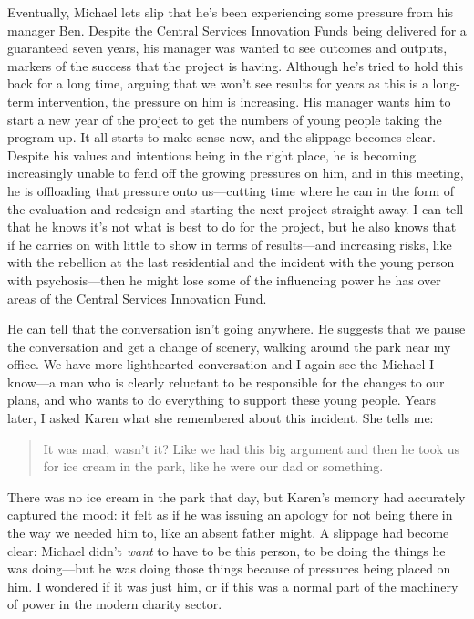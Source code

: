 Eventually, Michael lets slip that he's been experiencing some pressure from his manager Ben. Despite the Central Services Innovation Funds being delivered for a guaranteed seven years, his manager was wanted to see outcomes and outputs, markers of the success that the project is having. Although he's tried to hold this back for a long time, arguing that we won't see results for years as this is a long-term intervention, the pressure on him is increasing. His manager wants him to start a new year of the project to get the numbers of young people taking the program up. It all starts to make sense now, and the slippage becomes clear. Despite his values and intentions being in the right place, he is becoming increasingly unable to fend off the growing pressures on him, and in this meeting, he is offloading that pressure onto us—cutting time where he can in the form of the evaluation and redesign and starting the next project straight away. I can tell that he knows it's not what is best to do for the project, but he also knows that if he carries on  with little to show in terms of results—and increasing risks, like with the rebellion at the last residential and the incident with the young person with psychosis—then he might lose some of the influencing power he has over areas of the Central Services Innovation Fund.

He can tell that the conversation isn't going anywhere. He suggests that we pause the conversation and get a change of scenery, walking around the park near my office. We have more lighthearted conversation and I again see the Michael I know—a man who is clearly reluctant to be responsible for the changes to our plans, and who wants to do everything to support these young people. Years later, I asked Karen what she remembered about this incident. She tells me:
\begin{quote}
It was mad, wasn't it? Like we had this big argument and then he took us for ice cream in the park, like he were our dad or something.
\end{quote}

There was no ice cream in the park that day, but Karen's memory had accurately captured the mood: it felt as if he was issuing an apology for not being there in the way we needed him to, like an absent father might. A slippage had become clear: Michael didn't \textit{want} to have to be this person, to be doing the things he was doing—but he was doing those things because of pressures being placed on him. I wondered if it was just him, or if this was a normal part of the machinery of power in the modern charity sector.

